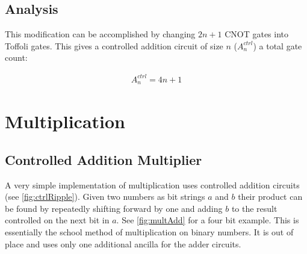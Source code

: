     \subsection{Analysis}

      This modification can be accomplished by changing $2n+1$ CNOT gates into
      Toffoli gates.  This gives a controlled addition circuit of size $n$
      ($A^{ctrl}_n$) a total gate count:

      \begin{align} \label{eq:cadd}
        A^{ctrl}_n = 4n+1
      \end{align}

\section{Multiplication}
  \subsection{Controlled Addition Multiplier}

    A very simple implementation of multiplication uses controlled addition
    circuits (see \cref{fig:ctrlRipple}).  Given two numbers as bit strings $a$
    and $b$ their product can be found by repeatedly shifting forward by one
    and adding $b$ to the result controlled on the next bit in $a$.  See
    \cref{fig:multAdd} for a four bit example. This is essentially the school
    method of multiplication on binary numbers. It is out of place and uses
    only one additional ancilla for the adder circuits.

